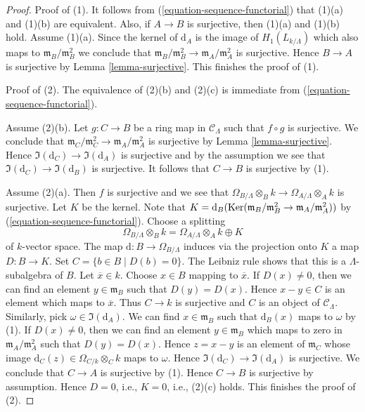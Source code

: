 \begin{proof}
Proof of (1). It follows from (\ref{equation-sequence-functorial})
that (1)(a) and (1)(b) are equivalent. Also, if
$A \to B$ is surjective, then (1)(a) and (1)(b) hold. Assume (1)(a).
Since the kernel of $\text{d}_A$ is the image of
$H_1(L_{k/\Lambda})$ which also maps to
$\mathfrak m_B/\mathfrak m_B^2$ we conclude that
$\mathfrak m_B/\mathfrak m_B^2 \to \mathfrak m_A/\mathfrak m_A^2$
is surjective. Hence $B \to A$ is surjective by
Lemma \ref{lemma-surjective}. This finishes the proof of (1).

\medskip\noindent
Proof of (2). The equivalence of (2)(b) and (2)(c) is immediate from
(\ref{equation-sequence-functorial}).

\medskip\noindent
Assume (2)(b). Let $g : C \to B$ be a ring map in $\mathcal{C}_\Lambda$
such that $f \circ g$ is surjective. We conclude that
$\mathfrak m_C/\mathfrak m_C^2 \to \mathfrak m_A/\mathfrak m_A^2$
is surjective by
Lemma \ref{lemma-surjective}.
Hence
$\Im(\text{d}_C) \to \Im(\text{d}_A)$ is surjective
and by the assumption we see that
$\Im(\text{d}_C) \to \Im(\text{d}_B)$ is surjective.
It follows that $C \to B$ is surjective by (1).

\medskip\noindent
Assume (2)(a). Then $f$ is surjective and we see that
$\Omega_{B/\Lambda} \otimes_B k \to \Omega_{A/\Lambda} \otimes_A k$
is surjective. Let $K$ be the kernel. Note that
$K = \text{d}_B(\mathop{\mathrm{Ker}}(\mathfrak m_B/\mathfrak m_B^2 \to
\mathfrak m_A/\mathfrak m_A^2))$ by (\ref{equation-sequence-functorial}).
Choose a splitting
$$
\Omega_{B/\Lambda} \otimes_B k =
\Omega_{A/\Lambda} \otimes_A k \oplus K
$$
of $k$-vector space. The map $\text{d} : B \to \Omega_{B/\Lambda}$
induces via the projection onto $K$ a map $D : B \to K$. Set
$C = \{b \in B \mid D(b) = 0\}$. The Leibniz rule shows that this is
a $\Lambda$-subalgebra of $B$. Let $\overline{x} \in k$. Choose $x \in B$
mapping to $\overline{x}$. If $D(x) \not = 0$, then we can find an element
$y \in \mathfrak m_B$ such that $D(y) = D(x)$. Hence $x - y \in C$ is
an element which maps to $\overline{x}$. Thus $C \to k$ is surjective
and $C$ is an object of $\mathcal{C}_\Lambda$. Similarly, pick
$\omega \in \Im(\text{d}_A)$. We can find $x \in \mathfrak m_B$
such that $\text{d}_B(x)$ maps to $\omega$ by (1). If $D(x) \not = 0$, then
we can find an element $y \in \mathfrak m_B$ which maps to zero
in $\mathfrak m_A/\mathfrak m_A^2$ such that $D(y) = D(x)$.
Hence $z = x - y$ is an element of $\mathfrak m_C$ whose
image $\text{d}_C(z) \in \Omega_{C/k} \otimes_C k$ maps to $\omega$.
Hence $\Im(\text{d}_C) \to \Im(\text{d}_A)$ is surjective.
We conclude that $C \to A$ is surjective by (1). Hence $C \to B$ is
surjective by assumption. Hence $D = 0$, i.e., $K = 0$, i.e., (2)(c) holds.
This finishes the proof of (2).


\end{proof}

